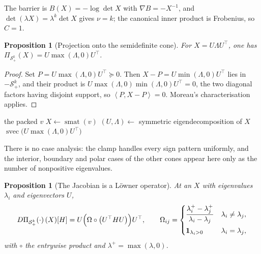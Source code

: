 \documentclass[a4paper,11pt]{book}
\theoremstyle{plain}
\newtheorem{proposition}[theorem]{Proposition}
\theoremstyle{definition}
\theoremstyle{remark}
\numberwithin{equation}{chapter}
\numberwithin{algorithm}{chapter}
\newcommand{\Sp}{\mathcal{S}}
\newcommand{\proj}[2]{\Pi_{#2}\!\left(#1\right)}
\newcommand{\inner}[2]{\left\langle #1, #2 \right\rangle}
\newcommand{\svec}{\operatorname{svec}}
\newcommand{\smat}{\operatorname{smat}}
\begin{document}
	The barrier is $B(X)=-\log\det X$ with $\nabla B=-X^{-1}$, and
	$\det(\lambda X)=\lambda^k\det X$ gives $\nu=k$; the canonical inner product
	is Frobenius, so $C=1$.

	\begin{proposition}[Projection onto the semidefinite cone]
		For $X=U\Lambda U^{\top}$, one has
		$\proj{X}{\Sp^k_+}=U\max(\Lambda,0)U^{\top}$.
	\end{proposition}

	\begin{proof}
		Set $P=U\max(\Lambda,0)U^{\top}\succeq0$. Then
		$X-P=U\min(\Lambda,0)U^{\top}$ lies in $-\Sp^k_+$, and their product is
		$U\max(\Lambda,0)\min(\Lambda,0)U^{\top}=0$, the two diagonal factors having
		disjoint support, so $\inner{P}{X-P}=0$. Moreau's characterisation applies.
	\end{proof}

	\begin{algorithm}[H]
		\caption{Projection onto the semidefinite cone}
		\begin{algorithmic}[1]
			\Require the packed $v$
			\State $X\gets\smat(v)$ 
			\State $(U,\Lambda)\gets$ symmetric eigendecomposition of $X$
			\State \Return $\svec\bigl(U\max(\Lambda,0)U^{\top}\bigr)$
		\end{algorithmic}
	\end{algorithm}

	There is no case analysis: the clamp handles every sign pattern uniformly, and
	the interior, boundary and polar cases of the other cones appear here only as
	the number of nonpositive eigenvalues.

	\begin{proposition}[The Jacobian is a Löwner operator]\label{prop:lowner}
		At an $X$ with eigenvalues $\lambda_i$ and eigenvectors $U$,
		\begin{equation}
			D\proj{\cdot}{\Sp^k_+}(X)[H]
			=U\Bigl(\Omega\circ\bigl(U^{\top}HU\bigr)\Bigr)U^{\top},
			\qquad
			\Omega_{ij}=
			\begin{cases}
				\dfrac{\lambda_i^+-\lambda_j^+}{\lambda_i-\lambda_j}
				& \lambda_i\neq\lambda_j,\\[3mm]
				\mathbf{1}_{\lambda_i>0} & \lambda_i=\lambda_j ,
			\end{cases}
		\end{equation}
		with $\circ$ the entrywise product and $\lambda^+=\max(\lambda,0)$.
	\end{proposition}
\end{document}
